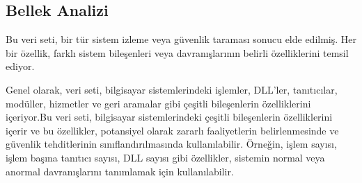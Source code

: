 \documentclass{article}
\begin{document}
\subsection{Bellek Analizi}
Bu veri seti, bir tür sistem izleme veya güvenlik taraması sonucu elde edilmiş. Her bir özellik, farklı sistem bileşenleri veya davranışlarının belirli özelliklerini temsil ediyor.



Genel olarak, veri seti, bilgisayar sistemlerindeki işlemler, DLL'ler, tanıtıcılar, modüller, hizmetler ve geri aramalar gibi çeşitli bileşenlerin özelliklerini içeriyor.Bu veri seti, bilgisayar sistemlerindeki çeşitli bileşenlerin özelliklerini içerir ve bu özellikler, potansiyel olarak zararlı faaliyetlerin belirlenmesinde ve güvenlik tehditlerinin sınıflandırılmasında kullanılabilir. Örneğin, işlem sayısı, işlem başına tanıtıcı sayısı, DLL sayısı gibi özellikler, sistemin normal veya anormal davranışlarını tanımlamak için kullanılabilir.\cite{c}
\end{document}
